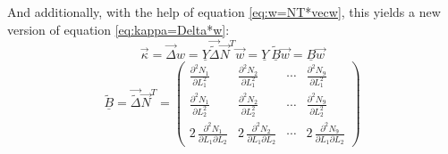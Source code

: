  And additionally, with the help of equation \eqref{eq:w=NT*vecw}, this yields a new version of equation \eqref{eq:kappa=Delta*w}:
  \begin{equation}\label{eq:kappa=YBw}
  \vec{\kappa} = \vec{\Delta} w = \underline{Y} \vec{\tilde{\Delta}} \vec{N}^T \vec{w} = \underline{Y}\:\underline{\tilde{B}} \vec{w} = \underline{B} \vec{w}
  \end{equation}
  \begin{equation}
  \underline{\tilde{B}} = \vec{\tilde{\Delta}} \vec{N}^T = \begin{pmatrix}
  \frac{\partial^2 N_1}{\partial L_1^2} & \frac{\partial^2 N_2}{\partial L_1^2} & \cdots & \frac{\partial^2 N_9}{\partial L_1^2}\\
  \frac{\partial^2 N_1}{\partial L_2^2} & \frac{\partial^2 N_2}{\partial L_2^2} & \cdots & \frac{\partial^2 N_9}{\partial L_2^2}\\
  2\,\frac{\partial^2 N_1}{\partial L_1 \partial L_2} & 2\,\frac{\partial^2 N_2}{\partial L_1 \partial L_2} & \cdots & 2\,\frac{\partial^2 N_9}{\partial L_1 \partial L_2}
  \end{pmatrix}
  \end{equation}
  
